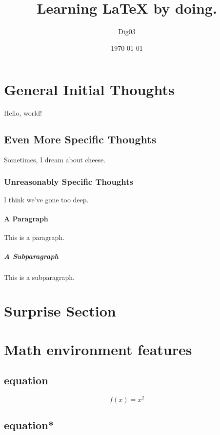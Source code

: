 \documentclass{article}
\title{Learning \LaTeX{} by doing.}
\date{\today}
\author{Dig03}
\begin{document}
\maketitle %
\newpage   %

\section{General Initial Thoughts}

Hello, world!

\subsection{Even More Specific Thoughts}

Sometimes, I dream about cheese.

\subsubsection{Unreasonably Specific Thoughts}

I think we've gone too deep.

\paragraph{A Paragraph}

This is a paragraph.

\subparagraph{A Subparagraph}

This is a subparagraph.

\section{Surprise Section}

\section{Math environment features}

\subsection{equation}

\begin{equation}
	f(x) = x^2
\end{equation}

\subsection{equation*}
\end{document}
